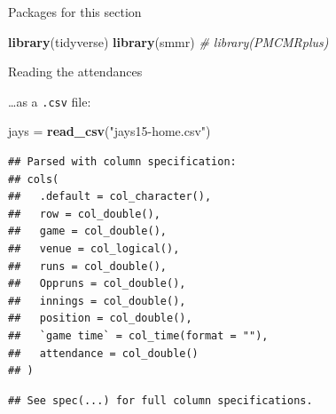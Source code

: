 \documentclass[ignorenonframetext,]{beamer}
\newenvironment{Shaded}{\begin{snugshade}}{\end{snugshade}}
\newcommand{\CommentTok}[1]{\textcolor[rgb]{0.56,0.35,0.01}{\textit{#1}}}
\newcommand{\KeywordTok}[1]{\textcolor[rgb]{0.13,0.29,0.53}{\textbf{#1}}}
\newcommand{\NormalTok}[1]{#1}
\newcommand{\StringTok}[1]{\textcolor[rgb]{0.31,0.60,0.02}{#1}}
\begin{document}
\begin{frame}[fragile]{Packages for this section}
\protect\hypertarget{packages-for-this-section-3}{}

\begin{Shaded}
\begin{Highlighting}[]
\KeywordTok{library}\NormalTok{(tidyverse)}
\KeywordTok{library}\NormalTok{(smmr)}
\CommentTok{# library(PMCMRplus)}
\end{Highlighting}
\end{Shaded}

\end{frame}

\begin{frame}[fragile]{Reading the attendances}
\protect\hypertarget{reading-the-attendances}{}

\ldots{}as a \texttt{.csv} file:

\begin{Shaded}
\begin{Highlighting}[]
\NormalTok{jays =}\StringTok{ }\KeywordTok{read_csv}\NormalTok{(}\StringTok{"jays15-home.csv"}\NormalTok{)}
\end{Highlighting}
\end{Shaded}

\begin{verbatim}
## Parsed with column specification:
## cols(
##   .default = col_character(),
##   row = col_double(),
##   game = col_double(),
##   venue = col_logical(),
##   runs = col_double(),
##   Oppruns = col_double(),
##   innings = col_double(),
##   position = col_double(),
##   `game time` = col_time(format = ""),
##   attendance = col_double()
## )
\end{verbatim}

\begin{verbatim}
## See spec(...) for full column specifications.
\end{verbatim}

\end{frame}
\end{document}
